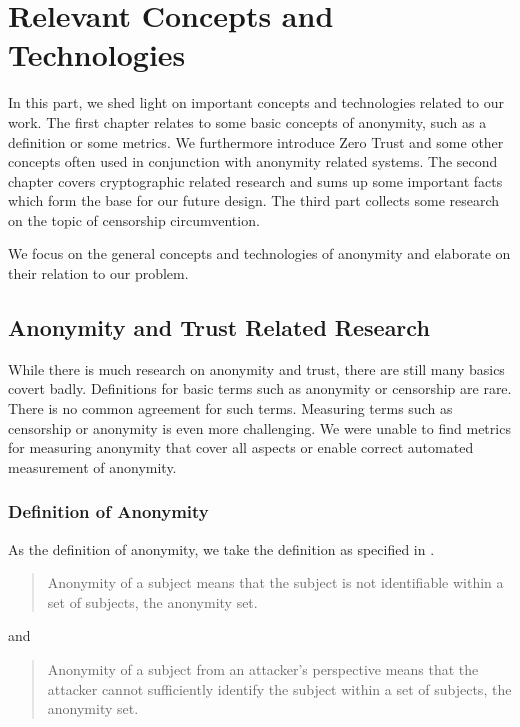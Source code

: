 

\part{Relevant Concepts and Technologies}\label{sec:concepts}
In this part, we shed light on important concepts and technologies related to our work. The first chapter relates to some basic concepts of anonymity, such as a definition or some metrics. We furthermore introduce Zero Trust and some other concepts often used in conjunction with anonymity related systems. The second chapter covers cryptographic related research and sums up some important facts which form the base for our future design. The third part collects some research on the topic of censorship circumvention.

We focus on the general concepts and technologies of anonymity and elaborate on their relation to our problem.

\chapter{Anonymity and Trust Related Research}
While there is much research on anonymity and trust, there are still many basics covert badly. Definitions for basic terms such as anonymity or censorship are rare. There is no common agreement for such terms. Measuring terms such as censorship or anonymity is even more challenging. We were unable to find metrics for measuring anonymity that cover all aspects or enable correct automated measurement of anonymity.

\section{Definition of Anonymity}
As the definition of anonymity, we take the definition as specified in \cite{anonTerminology}.
\begin{quote}
	Anonymity of a subject means that the subject is not identifiable within a set of subjects, the anonymity set.\omitted
\end{quote}
and
\begin{quote}
	Anonymity of a subject from an attacker's perspective means that the attacker cannot sufficiently identify the subject within a set of subjects, the anonymity set.\omitted
\end{quote}

